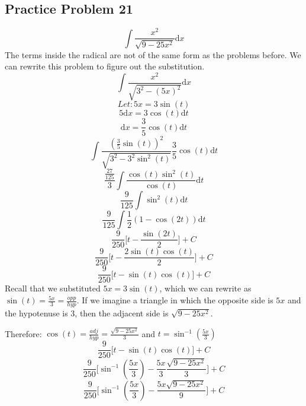 \documentclass[letterpaper, 12pt]{article}
\renewcommand*{\arcsin}{\sin^{-1}}
\newcommand*{\diff}{\mathrm{d}}
\begin{document}
\subsection*{Practice Problem 21}
\[ \int{\frac{x^{2}}{\sqrt{9-25x^{2}}}\diff{x}} \]
The terms inside the radical are not of the same form as the problems
before. We can rewrite this problem to figure out the substitution.
\[ \int{\frac{x^{2}}{\sqrt{3^{2}-(5x)^{2}}}\diff{x}} \]
\[ Let: 5x = 3\sin(t) \]
\[ 5\diff{x} = 3\cos(t)\diff{t} \]
\[ \diff{x} = \frac{3}{5}\cos(t)\diff{t} \]
\[ \int{\frac{(\frac{3}{5}\sin(t))^{2}}{\sqrt{3^{2}-3^{2}\sin^{2}(t)}}
   \frac{3}{5}\cos(t)\diff{t}} \]
\[ \frac{\frac{27}{125}}{3}
   \int{\frac{\cos(t)\sin^{2}(t)}{\cos(t)}\diff{t}} \]
\[ \frac{9}{125}\int{\sin^{2}(t)\diff{t}} \]
\[ \frac{9}{125}\int{\frac{1}{2}(1-\cos(2t))\diff{t}} \]
\[ \frac{9}{250}\bigg[t-\frac{\sin(2t)}{2}\bigg]+C \]
\[ \frac{9}{250}\bigg[t-\frac{2\sin(t)\cos(t)}{2}\bigg]+C \]
\[ \frac{9}{250}\bigg[t-\sin(t)\cos(t)\bigg]+C \]
Recall that we substituted \( 5x = 3\sin(t) \), which we can rewrite as
\( \sin(t) = \frac{5x}{3} = \frac{opp}{hyp} \). If we imagine a triangle
in which the opposite side is \( 5x \) and the hypotenuse is 3, then the
adjacent side is \( \sqrt{9-25x^{2}} \).
\begin{center}
\end{center}
Therefore: \( \cos(t) = \frac{adj}{hyp} = \frac{\sqrt{9-25x^{2}}}{3} \)
and \( t = \arcsin(\frac{5x}{3}) \)
\[ \frac{9}{250}\bigg[t-\sin(t)\cos(t)\bigg]+C \]
\[ \frac{9}{250}\bigg[\arcsin(\frac{5x}{3})-
   \frac{5x}{3}\frac{\sqrt{9-25x^{2}}}{3}\bigg]+C \]
\[ \frac{9}{250}\bigg[\arcsin(\frac{5x}{3})-
   \frac{5x\sqrt{9-25x^{2}}}{9}\bigg]+C \]
\end{document}
